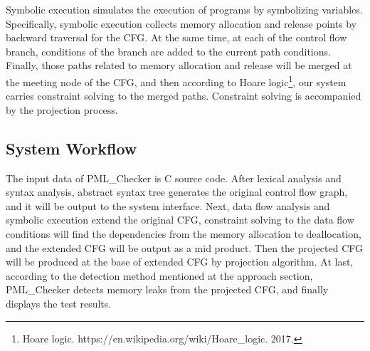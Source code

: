 Symbolic execution simulates the execution of programs by symbolizing variables. Specifically, symbolic execution collects memory allocation and release points by backward traversal for the CFG. At the same time, at each of the control flow branch, conditions of the branch are added to the current path conditions. Finally, those paths related to memory allocation and release will be merged at the meeting node of the CFG, and then according to Hoare logic\footnote{Hoare logic. https://en.wikipedia.org/wiki/Hoare\_logic. 2017.}, our system carries constraint solving to the merged paths. Constraint solving is accompanied by the projection process.  

\subsection{System Workflow}


The input data of PML\_Checker is C source code. After lexical analysis and syntax analysis, abstract syntax tree generates the original control flow graph, and it will be output to the system interface. Next, data flow analysis and symbolic execution extend the original CFG, constraint solving to the data flow conditions will find the dependencies from the memory allocation to deallocation, and the extended CFG will be output as a mid product. Then the projected CFG will be produced at the base of extended CFG by projection algorithm. At last, according to the detection method mentioned at the approach section, PML\_Checker detects memory leaks from the projected CFG, and finally displays the test results. 

